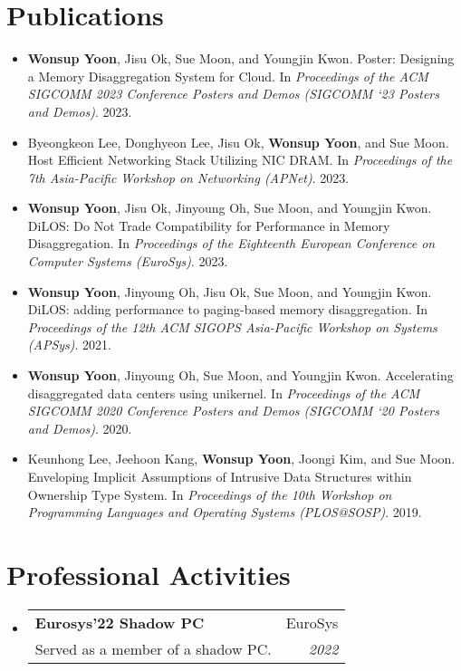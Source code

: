 \documentclass[letterpaper,11pt]{article}
\makeatletter
\newcommand{\resumePub}[1]{
  \item\small{#1 \vspace{-2pt}}
}
\newcommand{\resumeSubheading}[4]{
  \vspace{-1pt}\item
    \begin{tabular*}{0.97\textwidth}[t]{l@{\extracolsep{\fill}}r}
      \textbf{#1} & #2 \\
      {\small#3} & \textit{\small #4} \\
    \end{tabular*}\vspace{-5pt}
}
\newcommand{\resumeSubHeadingListStart}{\begin{itemize}[leftmargin=*]}
\newcommand{\resumeSubHeadingListEnd}{\end{itemize}}
\makeatother
\begin{document}
\section{Publications}
\resumeSubHeadingListStart
\resumePub{\textbf{Wonsup Yoon}, Jisu Ok, Sue Moon, and Youngjin Kwon. Poster: Designing a Memory Disaggregation System for Cloud. In \textit{Proceedings of the ACM SIGCOMM 2023 Conference Posters and Demos (SIGCOMM ‘23 Posters and Demos)}. 2023.}
\resumePub{Byeongkeon Lee, Donghyeon Lee, Jisu Ok, \textbf{Wonsup Yoon}, and Sue Moon. Host Efficient Networking Stack Utilizing NIC DRAM. In \textit{Proceedings of the 7th Asia-Pacific Workshop on Networking (APNet)}. 2023.}
\resumePub{\textbf{Wonsup Yoon}, Jisu Ok, Jinyoung Oh, Sue Moon, and Youngjin Kwon. DiLOS: Do Not Trade Compatibility for Performance in Memory Disaggregation. In \textit{Proceedings of the Eighteenth European Conference on Computer Systems (EuroSys)}. 2023.}
\resumePub{\textbf{Wonsup Yoon}, Jinyoung Oh, Jisu Ok, Sue Moon, and Youngjin Kwon. DiLOS: adding performance to paging-based memory disaggregation. In \textit{Proceedings of the 12th ACM SIGOPS Asia-Pacific Workshop on Systems (APSys)}. 2021.}
\resumePub{\textbf{Wonsup Yoon}, Jinyoung Oh, Sue Moon, and Youngjin Kwon. Accelerating disaggregated data centers using unikernel. In \textit{Proceedings of the ACM SIGCOMM 2020 Conference Posters and Demos (SIGCOMM ‘20 Posters and Demos)}. 2020.}
\resumePub{Keunhong Lee, Jeehoon Kang, \textbf{Wonsup Yoon}, Joongi Kim, and Sue Moon. Enveloping Implicit Assumptions of Intrusive Data Structures within Ownership Type System. In \textit{Proceedings of the 10th Workshop on Programming Languages and Operating Systems (PLOS@SOSP)}. 2019.}
\resumeSubHeadingListEnd

%
\section{Professional Activities}
\resumeSubHeadingListStart
\resumeSubheading
{Eurosys'22 Shadow PC}{EuroSys}
{Served as a member of a shadow PC.}{2022}
\resumeSubHeadingListEnd


\end{document}
